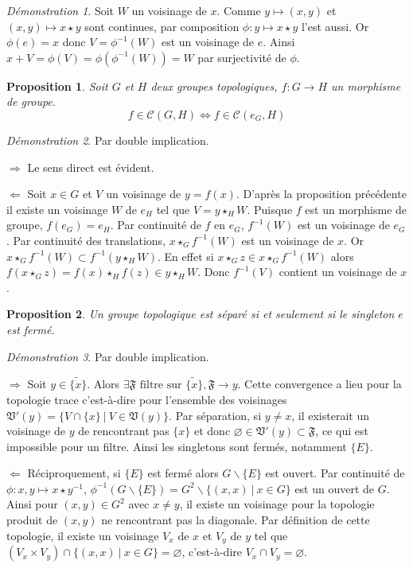 \documentclass[a4paper, 11pt, french]{book}
\newenvironment{itemise}{\itemize}{\enditemize}
\theoremstyle{plain} %
\newtheorem{proposition}{Proposition}
\theoremstyle{definition} %
\theoremstyle{remark} %
\newtheorem*{demonstration}{Démonstration}
\renewcommand{\setminus}{\backslash}
\newcommand{\1}{\mathds{1}}
\newcommand\vide{\varnothing}
\newcommand{\inv}[1]{#1^{-1}}
\renewcommand{\cal}[1]{\mathcal{#1}}
\renewcommand{\frak}[1]{\mathfrak{#1}}
\newcommand\ens[2]{\{#1 \ |\ #2\}}
\newcommand\equivalence[3]{
	\begin{demonstration}
		#1
		\begin{itemise}
			\item[$\Longrightarrow$] #2
			\item[$\Longleftarrow$] #3
		\end{itemise}
	\end{demonstration}
}
\begin{document}
\begin{demonstration}
	Soit $W$ un voisinage de $x$.
	Comme $y\longmapsto(x, y)$ et $(x, y)\longmapsto x\star y$ sont continues, par composition $\phi:y\longmapsto x\star y$ l'est aussi.
	Or $\phi(e)=x$ donc $V=\inv{\phi}(W)$ est un voisinage de $e$.
	Ainsi $x+V=\phi(V)=\phi(\inv{\phi}(W))=W$ par surjectivité de $\phi$.
\end{demonstration}

\begin{proposition}
	Soit $G$ et $H$ deux groupes topologiques, $f:G\rightarrow H$ un morphisme de groupe.
	$$
		f\in\cal{C}(G, H)\iff f\in\cal{C}(e_G, H)
	$$
\end{proposition}

\equivalence{Par double implication.}{
	Le sens direct est évident.
}{
	Soit $x\in G$ et $V$ un voisinage de $y=f(x)$.
	D'après la proposition précédente il existe un voisinage $W$ de $e_H$ tel que $V=y\star_HW$.
	Puisque $f$ est un morphisme de groupe, $f(e_G)=e_H$.
	Par continuité de $f$ en $e_G$, $\inv{f}(W)$ est un voisinage de $e_G$.
	Par continuité des translations, $x\star_G\inv{f}(W)$ est un voisinage de $x$.
	Or $x\star_G\inv{f}(W)\subset\inv{f}(y\star_HW)$.
	En effet si $x\star_Gz\in x\star_G\inv{f}(W)$ alors $f(x\star_Gz)=f(x)\star_Hf(z)\in y\star_HW$.
	Donc $\inv{f}(V)$ contient un voisinage de $x$.
}

\begin{proposition}
	Un groupe topologique est séparé si et seulement si le singleton ${e}$ est fermé.
\end{proposition}

\equivalence{Par double implication.}{
	Soit $y\in\widetilde{\{x\}}$.
	Alors $\exists\frak{F}\text{ filtre sur $\widetilde{\{x\}}$}, \frak{F}\rightarrow y$.
	Cette convergence a lieu pour la topologie trace c'est-à-dire pour l'ensemble des voisinages $\frak{V}'(y)=\{V\cap\ens{x\}}{V\in\frak{V}(y)}$.
	Par séparation, si $y\neq x$, il existerait un voisinage de $y$ de rencontrant pas $\{x\}$ et donc $\vide\in\frak{V}'(y)\subset\frak{F}$, ce qui est impossible pour un filtre.
	Ainsi les singletons sont fermés, notamment $\{E\}$.
}{
	Réciproquement, si $\{E\}$ est fermé alors $G\setminus\{E\}$ est ouvert.
	Par continuité de $\phi:x, y\longmapsto x\star\inv{y}$, $\inv{\phi}(G\setminus\{E\})=G^2\setminus\ens{(x, x)}{x\in G}$ est un ouvert de $G$.
	Ainsi pour $(x, y)\in G^2$ avec $x\neq y$, il existe un voisinage pour la topologie produit de $(x, y)$ ne rencontrant pas la diagonale.
	Par définition de cette topologie, il existe un voisinage $V_x$ de $x$ et $V_y$ de $y$ tel que $(V_x\times V_y)\cap\ens{(x, x)}{x\in G}=\vide$, c'est-à-dire $V_x\cap V_y=\vide$.
}
\end{document}
